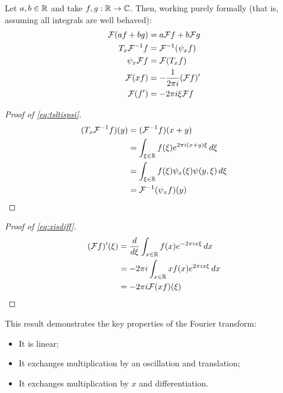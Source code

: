       \begin{lemma}
        \label{lemma:fourprops}
        Let $a,b\in\mathbb{R}$ and take $f,g:\mathbb{R}\rightarrow\mathbb{C}$.
        Then, working purely formally (that is, assuming all integrals are well behaved):
        \begin{align}
          \mathcal{F}(af + bg) &= a\mathcal{F} f + b\mathcal{F} g\\
          \label{eq:tsltispsi}
            T_x\mathcal{F}^{-1}f &= \mathcal{F}^{-1}(\psi_xf)\\
          \label{eq:tsltispsi2}
          \psi_x\mathcal{F} f &= \mathcal{F}(T_xf)\\
          \label{eq:xisdiff}
            \mathcal{F}(xf) &= -\frac{1}{2\pi i}(\mathcal{F} f)'\\
          \label{eq:xisdiff2}
            \mathcal{F}(f') &= -2\pi i\xi\mathcal{F} f
        \end{align}
        \begin{proof}[Proof of \eqref{eq:tsltispsi}]
          \begin{align*}
            (T_x\mathcal{F}^{-1}f)(y) &= (\mathcal{F}^{-1}f)(x+y)\\
            &= \int_{\xi\in\mathbb{R}}f(\xi)e^{2\pi i(x+y)\xi}\,d\xi\\
            &= \int_{\xi\in\mathbb{R}}f(\xi)\psi_x(\xi)\psi(y,\xi)\,d\xi\\
            &= \mathcal{F}^{-1}(\psi_xf)(y)
          \end{align*}
        \end{proof}
        \begin{proof}[Proof of \eqref{eq:xisdiff}]
          \begin{align*}
            (\mathcal{F} f)'(\xi) &= \frac{d}{d\xi}\int_{x\in\mathbb{R}} f(x)e^{-2\pi i x\xi}\,dx\\
            &= -2\pi i \int_{x\in\mathbb{R}} xf(x)e^{2\pi i x\xi}\,dx\\
            &= -2\pi i\mathcal{F}(xf)(\xi)
          \end{align*}
        \end{proof}
      \end{lemma}
      This result demonstrates the key properties of the Fourier transform:
      \begin{itemize}
        \item It is linear;
        \item It exchanges multiplication by an oscillation and translation;
        \item It exchanges multiplication by $x$ and differentiation.
      \end{itemize}


